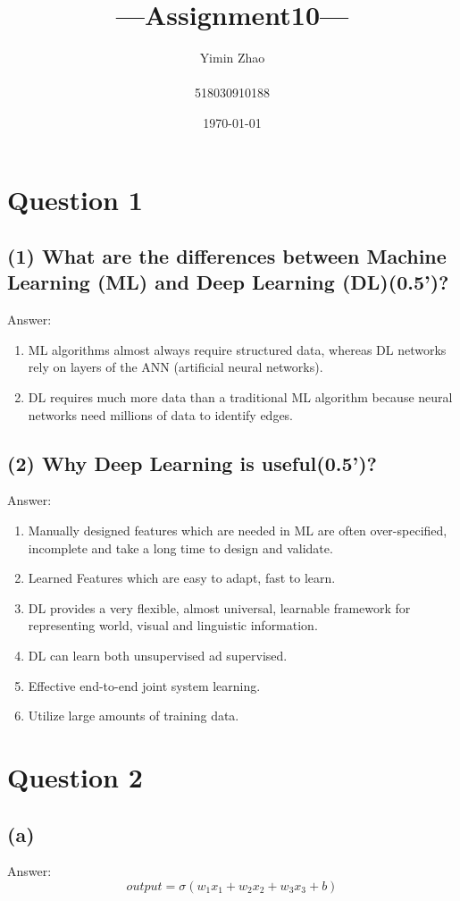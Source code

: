 \documentclass[18pt, A4]{article}
\title{---Assignment10---}
\author{Yimin Zhao \\ \\518030910188}
\date{\today}
\begin{document}
\maketitle
\pagebreak
    \section*{Question 1}
    \subsection*{(1) What are the differences between Machine Learning (ML) and Deep Learning (DL)(0.5')?} 
    Answer: 
    \begin{enumerate}

        \item  ML algorithms almost always require structured data, whereas DL networks rely on layers of the ANN (artificial neural networks).

        \item DL requires much more data than a traditional ML algorithm because neural networks need millions of data to identify edges.
    \end{enumerate}
    \subsection*{(2) Why Deep Learning is useful(0.5')?}
    Answer:
    \begin{enumerate}
        \item Manually designed features which are needed in ML are often over-specified, incomplete and take a long time to design and validate.

        \item Learned Features which are easy to adapt, fast to learn.
        \item DL provides a very flexible, almost universal, learnable framework for representing world, visual and linguistic information.
        \item DL can learn both unsupervised ad supervised.
        \item Effective end-to-end joint system learning.
        \item Utilize large amounts of training data.
    \end{enumerate}
    \section*{Question 2}
    \subsection*{(a)}
    Answer:
    $$ output = \sigma (w_1x_1 + w_2x_2 + w_3x_3 +b) $$
\end{document}
